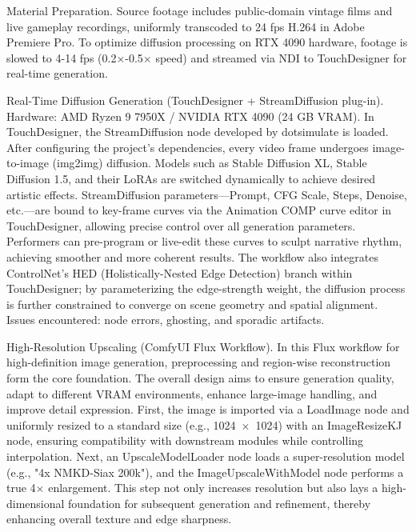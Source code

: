 \documentclass[sigconf,nonacm]{acmart}
\begin{document}
{Material Preparation.}
Source footage includes public-domain vintage films and live gameplay recordings, uniformly transcoded to 24 fps H.264 in Adobe Premiere Pro. To optimize diffusion processing on RTX 4090 hardware, footage is slowed to 4-14 fps (0.2×-0.5× speed) and streamed via NDI to TouchDesigner for real-time generation.


{Real-Time Diffusion Generation (TouchDesigner + StreamDiffusion plug-in).}
Hardware: AMD Ryzen 9 7950X / NVIDIA RTX 4090 (24 GB VRAM).
In TouchDesigner, the StreamDiffusion node developed by dotsimulate is loaded. After configuring the project's dependencies, every video frame undergoes image-to-image (img2img) diffusion. Models such as Stable Diffusion XL, Stable Diffusion 1.5, and their LoRAs are switched dynamically to achieve desired artistic effects.
StreamDiffusion parameters—Prompt, CFG Scale, Steps, Denoise, etc.—are bound to key-frame curves via the Animation COMP curve editor in TouchDesigner, allowing precise control over all generation parameters. Performers can pre-program or live-edit these curves to sculpt narrative rhythm, achieving smoother and more coherent results.
The workflow also integrates ControlNet's HED (Holistically-Nested Edge Detection) branch within TouchDesigner; by parameterizing the edge-strength weight, the diffusion process is further constrained to converge on scene geometry and spatial alignment.
Issues encountered: node errors, ghosting, and sporadic artifacts.


{High-Resolution Upscaling (ComfyUI Flux Workflow).}
In this Flux workflow for high-definition image generation, preprocessing and region-wise reconstruction form the core foundation. The overall design aims to ensure generation quality, adapt to different VRAM environments, enhance large-image handling, and improve detail expression.
First, the image is imported via a LoadImage node and uniformly resized to a standard size (e.g., 1024~$\times$~1024) with an ImageResizeKJ node, ensuring compatibility with downstream modules while controlling interpolation. Next, an UpscaleModelLoader node loads a super-resolution model (e.g., "4x NMKD-Siax 200k"), and the ImageUpscaleWithModel node performs a true 4$\times$ enlargement. This step not only increases resolution but also lays a high-dimensional foundation for subsequent generation and refinement, thereby enhancing overall texture and edge sharpness.
\end{document}
